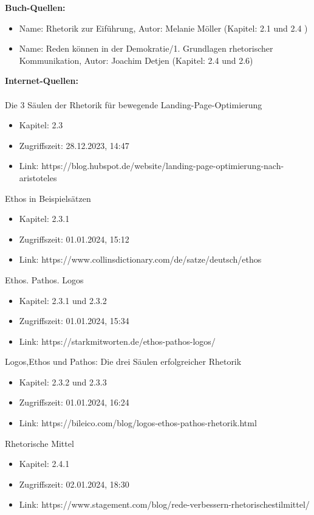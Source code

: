 \textbf{Buch-Quellen:}
\begin{itemize}
    \item Name: Rhetorik zur Eiführung, Autor: Melanie Möller (Kapitel: 2.1 und 2.4 )
    \item Name: Reden können in der Demokratie/1. Grundlagen rhetorischer Kommunikation, Autor: Joachim Detjen (Kapitel: 2.4 und 2.6)
\end{itemize}

\textbf{Internet-Quellen:}\\
\\Die 3 Säulen der Rhetorik für bewegende Landing-Page-Optimierung
\begin{itemize}
    \item Kapitel: 2.3
    \item Zugriffszeit: 28.12.2023, 14:47
    \item Link: https://blog.hubspot.de/website/landing-page-optimierung-nach-aristoteles
\end{itemize}
Ethos in Beispielsätzen
\begin{itemize}
    \item Kapitel: 2.3.1
    \item Zugriffszeit: 01.01.2024, 15:12
    \item Link: https://www.collinsdictionary.com/de/satze/deutsch/ethos
\end{itemize}
Ethos. Pathos. Logos
\begin{itemize}
    \item Kapitel: 2.3.1 und 2.3.2 
    \item Zugriffszeit: 01.01.2024, 15:34  
    \item Link: https://starkmitworten.de/ethos-pathos-logos/
\end{itemize}
Logos,Ethos und Pathos: Die drei Säulen erfolgreicher Rhetorik 
\begin{itemize}
    \item Kapitel: 2.3.2 und 2.3.3
    \item Zugriffszeit: 01.01.2024, 16:24  
    \item Link: https://bileico.com/blog/logos-ethos-pathos-rhetorik.html
\end{itemize}
Rhetorische Mittel
\begin{itemize}
    \item Kapitel: 2.4.1
    \item Zugriffszeit: 02.01.2024, 18:30
    \item Link: https://www.stagement.com/blog/rede-verbessern-rhetorischestilmittel/
\end{itemize}
